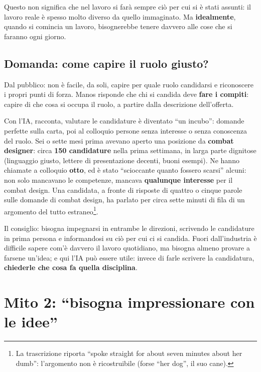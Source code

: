 Questo non significa che nel lavoro si farà sempre ciò per cui si è stati assunti:
il lavoro reale è spesso molto diverso da quello immaginato. Ma
\textbf{idealmente}, quando si comincia un lavoro, bisognerebbe tenere davvero alle
cose che si faranno ogni giorno.

\subsection{Domanda: come capire il ruolo giusto?}

Dal pubblico: non è facile, da soli, capire per quale ruolo candidarsi e
riconoscere i propri punti di forza. Manos risponde che chi si candida deve
\textbf{fare i compiti}: capire di che cosa si occupa il ruolo, a partire dalla
descrizione dell'offerta.

Con l'IA, racconta, valutare le candidature è diventato ``un incubo'': domande
perfette sulla carta, poi al colloquio persone senza interesse o senza conoscenza
del ruolo. Sei o sette mesi prima avevano aperto una posizione da \textbf{combat
designer}: circa \textbf{150 candidature} nella prima settimana, in larga parte
dignitose (linguaggio giusto, lettere di presentazione decenti, buoni esempi). Ne
hanno chiamate a colloquio \textbf{otto}, ed è stato ``scioccante quanto fossero
scarsi'' alcuni: non solo mancavano le competenze, mancava \textbf{qualunque
interesse} per il combat design. Una candidata, a fronte di risposte di quattro o
cinque parole sulle domande di combat design, ha parlato per circa sette minuti di
fila di un argomento del tutto estraneo\footnote{La trascrizione riporta ``spoke
straight for about seven minutes about her dumb'': l'argomento non è
ricostruibile (forse ``her dog'', il suo cane).}.

Il consiglio: bisogna impegnarsi in entrambe le direzioni, scrivendo le candidature
in prima persona e informandosi su ciò per cui ci si candida. Fuori dall'industria
è difficile sapere com'è davvero il lavoro quotidiano, ma bisogna almeno provare a
farsene un'idea; e qui l'IA può essere utile: invece di farle scrivere la
candidatura, \textbf{chiederle che cosa fa quella disciplina}.

\section{Mito 2: ``bisogna impressionare con le idee''}
\label{sec:c2-6-mito2}


